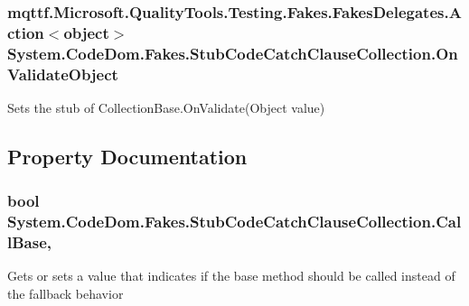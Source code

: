 \hypertarget{class_system_1_1_code_dom_1_1_fakes_1_1_stub_code_catch_clause_collection_aadcea850d67be6b5d66672d7519c3583}{
\subsubsection[{On\-Validate\-Object}]{\setlength{\rightskip}{0pt plus 5cm}mqttf.\-Microsoft.\-Quality\-Tools.\-Testing.\-Fakes.\-Fakes\-Delegates.\-Action$<$object$>$ System.\-Code\-Dom.\-Fakes.\-Stub\-Code\-Catch\-Clause\-Collection.\-On\-Validate\-Object}}\label{class_system_1_1_code_dom_1_1_fakes_1_1_stub_code_catch_clause_collection_aadcea850d67be6b5d66672d7519c3583}


Sets the stub of Collection\-Base.\-On\-Validate(\-Object value)



\subsection{Property Documentation}
\hypertarget{class_system_1_1_code_dom_1_1_fakes_1_1_stub_code_catch_clause_collection_a6afbdd51cd7d10d3beac8a945fd64c9e}{
\subsubsection[{Call\-Base}]{\setlength{\rightskip}{0pt plus 5cm}bool System.\-Code\-Dom.\-Fakes.\-Stub\-Code\-Catch\-Clause\-Collection.\-Call\-Base\hspace{0.3cm}{\ttfamily [get]}, {\ttfamily [set]}}}\label{class_system_1_1_code_dom_1_1_fakes_1_1_stub_code_catch_clause_collection_a6afbdd51cd7d10d3beac8a945fd64c9e}


Gets or sets a value that indicates if the base method should be called instead of the fallback behavior

